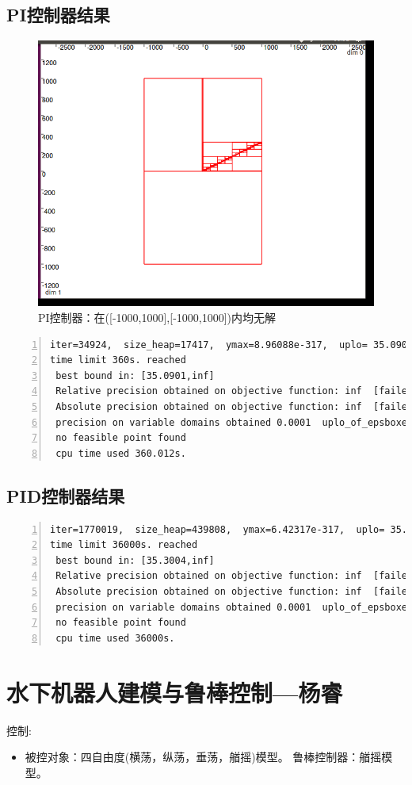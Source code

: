 \documentclass[UTF8,a4paper]{ctexart}
\begin{document}
   \subsection{PI控制器结果}
   \begin{figure}
  \includegraphics[width=.8\linewidth]{1.png}
  \caption{PI控制器：在([-1000,1000],[-1000,1000])内均无解}
  \label{fig:boat1}
\end{figure}
 \begin{lstlisting}[language={[ANSI]C},numbers=left,numberstyle=\tiny] 
iter=34924,  size_heap=17417,  ymax=8.96088e-317,  uplo= 35.0901
time limit 360s. reached 
 best bound in: [35.0901,inf]
 Relative precision obtained on objective function: inf  [failed]  0.01
 Absolute precision obtained on objective function: inf  [failed]  0
 precision on variable domains obtained 0.0001  uplo_of_epsboxes 36.2078
 no feasible point found 
 cpu time used 360.012s.
\end{lstlisting}
 \subsection{PID控制器结果}
 \begin{lstlisting}[language={[ANSI]C},numbers=left,numberstyle=\tiny]
 iter=1770019,  size_heap=439808,  ymax=6.42317e-317,  uplo= 35.3004
time limit 36000s. reached 
 best bound in: [35.3004,inf]
 Relative precision obtained on objective function: inf  [failed]  0.01
 Absolute precision obtained on objective function: inf  [failed]  0
 precision on variable domains obtained 0.0001  uplo_of_epsboxes 35.3004
 no feasible point found 
 cpu time used 36000s.
\end{lstlisting}
\section{水下机器人建模与鲁棒控制—杨睿}
控制:
\begin{itemize}
\item 被控对象：四自由度(横荡，纵荡，垂荡，艏摇)模型。 鲁棒控制器：艏摇模型。
\end{itemize}
\end{document}
